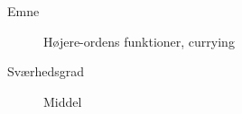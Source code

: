 \begin{description}
\item[Emne] Højere-ordens funktioner, currying
\item[Sværhedsgrad] Middel
\end{description}
